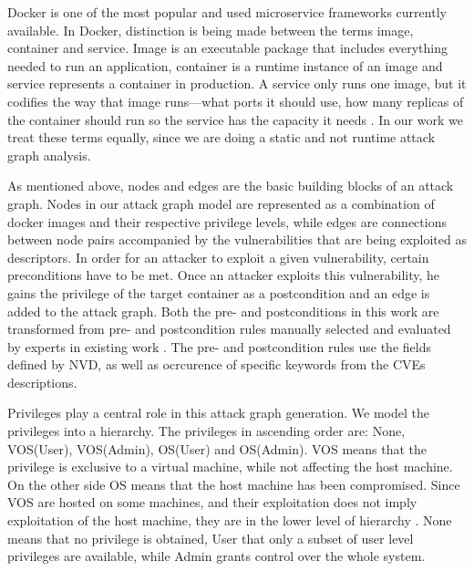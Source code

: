 Docker is one of the most popular and used microservice frameworks currently available. In Docker, distinction is being made between the terms image, container and service. Image is an executable package that includes everything needed to run an application, container is a runtime instance of an image and service represents a container in production. A service only runs one image, but it codifies the way that image runs—what ports it should use, how many replicas of the container should run so the service has the capacity it needs  \cite{merkel2014docker}. In our work we treat these terms equally, since we are doing a static and not runtime attack graph analysis.

As mentioned above, nodes and edges are the basic building blocks of an attack graph. Nodes in our attack graph model are represented as a combination of docker images and their respective privilege levels, while edges are connections between node pairs accompanied by the vulnerabilities that are being exploited as descriptors. In order for an attacker to exploit a given vulnerability, certain preconditions have to be met. Once an attacker exploits this vulnerability, he gains the privilege of the target container as a postcondition and an edge is added to the attack graph. Both the pre- and postconditions in this work are transformed from pre- and postcondition rules manually selected and evaluated by experts in existing work \cite{aksu2018automated}. The pre- and postcondition rules use the fields defined by NVD, as well as ocrcurence of specific keywords from the CVEs descriptions.

Privileges play a central role in this attack graph generation. We model the privileges into a hierarchy. The privileges in ascending order are: None, VOS(User), VOS(Admin), OS(User) and OS(Admin). VOS means that the privilege is exclusive to a virtual machine, while not affecting the host machine. On the other side OS means that the host machine has been compromised. Since VOS are hosted on some machines, and their exploitation does not imply exploitation of the host machine, they are in the lower level of hierarchy \cite{aksu2018automated}. None means that no privilege is obtained, User that only a subset of user level privileges are available, while Admin grants control over the whole system.


